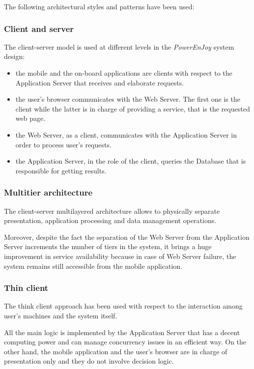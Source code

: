The following architectural styles and patterns have been used:

\subsubsection{Client and server}
The client-server model is used at different levels in the \emph{PowerEnJoy} system design:
\begin{itemize}
\item the mobile and the on-board applications are clients with respect to the Application Server that receives and elaborate requests.
\item the user's browser communicates with the Web Server. The first one is the client while the latter is in charge of providing a service, that is the requested web page.
\item the Web Server, as a client, communicates with the Application Server in order to process user's requests.
\item the Application Server, in the role of the client, queries the Database that is responsible for getting results.
\end{itemize}

\subsubsection{Multitier architecture}
The client-server multilayered architecture allows to physically separate presentation, application processing and data management operations.

Moreover, despite the fact the separation of the Web Server from the Application Server increments the number of tiers in the system, it brings a huge improvement in service availability because in case of Web Server failure, the system remains still accessible from the mobile application.

\subsubsection{Thin client}
The think client approach has been used with respect to the interaction among user's machines and the system itself.

All the main logic is implemented by the Application Server that has a decent computing power and can manage concurrency issues in an efficient way. On the other hand, the mobile application and the user's browser are in charge of presentation only and they do not involve decision logic.

